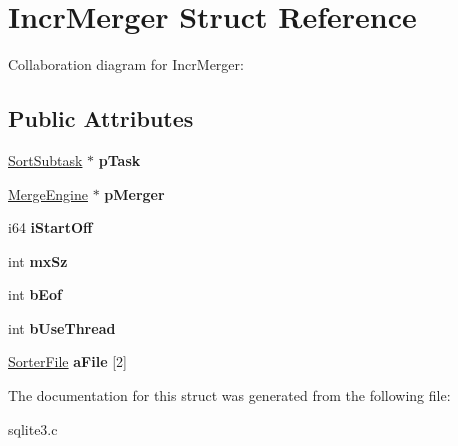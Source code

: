 \hypertarget{structIncrMerger}{}\section{Incr\+Merger Struct Reference}
\label{structIncrMerger}


Collaboration diagram for Incr\+Merger\+:
\subsection*{Public Attributes}
\begin{DoxyCompactItemize}
\item 
\hyperlink{structSortSubtask}{Sort\+Subtask} $\ast$ {\bfseries p\+Task}\hypertarget{structIncrMerger_a2b941a6bbca7d5c0fc0c0391c44eccda}{}\label{structIncrMerger_a2b941a6bbca7d5c0fc0c0391c44eccda}

\item 
\hyperlink{structMergeEngine}{Merge\+Engine} $\ast$ {\bfseries p\+Merger}\hypertarget{structIncrMerger_ac7335fe89a94112b63e206ac48656f4e}{}\label{structIncrMerger_ac7335fe89a94112b63e206ac48656f4e}

\item 
i64 {\bfseries i\+Start\+Off}\hypertarget{structIncrMerger_a88153aef88037ccac55eb5c9209a3e1b}{}\label{structIncrMerger_a88153aef88037ccac55eb5c9209a3e1b}

\item 
int {\bfseries mx\+Sz}\hypertarget{structIncrMerger_a333e98e9e5e951e2e00a109a95c4fbab}{}\label{structIncrMerger_a333e98e9e5e951e2e00a109a95c4fbab}

\item 
int {\bfseries b\+Eof}\hypertarget{structIncrMerger_af9ebc9bf53d72441086d98e379ca2721}{}\label{structIncrMerger_af9ebc9bf53d72441086d98e379ca2721}

\item 
int {\bfseries b\+Use\+Thread}\hypertarget{structIncrMerger_a5c4a9d27ce78f3edaa91c5d85c0f3474}{}\label{structIncrMerger_a5c4a9d27ce78f3edaa91c5d85c0f3474}

\item 
\hyperlink{structSorterFile}{Sorter\+File} {\bfseries a\+File} \mbox{[}2\mbox{]}\hypertarget{structIncrMerger_a276ff9bd9d3c7c9609cdfde70127bcc3}{}\label{structIncrMerger_a276ff9bd9d3c7c9609cdfde70127bcc3}

\end{DoxyCompactItemize}


The documentation for this struct was generated from the following file\+:\begin{DoxyCompactItemize}
\item 
sqlite3.\+c\end{DoxyCompactItemize}
